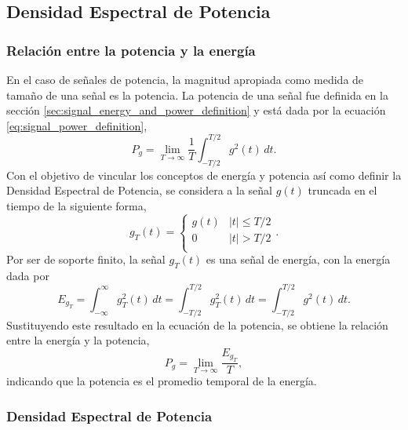 \documentclass[a4paper]{article}
\begin{document}
\subsection{Densidad Espectral de Potencia}

\subsubsection{Relación entre la potencia y la energía}

En el caso de señales de potencia, la magnitud apropiada como medida de tamaño de una señal es la potencia. La potencia de una señal fue definida en la sección \ref{sec:signal_energy_and_power_definition} y está dada por la ecuación \ref{eq:signal_power_definition},
\[
 P_g =  \lim_{T\to\infty}\frac{1}{T}\int_{-T/2}^{T/2}g^2(t)\,dt.
\]
Con el objetivo de vincular los conceptos de energía y potencia así como definir la Densidad Espectral de Potencia, se considera a la señal \(g(t)\) truncada en el tiempo de la siguiente forma,
\begin{equation}\label{eq:temporal_truncated_g}
 g_T(t)=
  \left\{\begin{array}{ll}
  g(t) & |t| \leq T/2\\
  0 & |t| > T/2\\ \end{array} \right..
\end{equation}
 Por ser de soporte finito, la señal \(g_T(t)\) es una señal de energía, con la energía dada por
 \[
  E_{g_T}=\int_{-\infty}^{\infty}g_T^2(t)\,dt=\int_{-T/2}^{T/2}g_T^2(t)\,dt=\int_{-T/2}^{T/2}g^2(t)\,dt.
 \]
 Sustituyendo este resultado en la ecuación de la potencia, se obtiene la relación entre la energía y la potencia,
 \[
  P_g =  \lim_{T\to\infty}\frac{E_{g_T}}{T},
 \]
indicando que la potencia es el promedio temporal de la energía.
 
\subsubsection{Densidad Espectral de Potencia}\label{sec:psd_deterministic}
 
\end{document}
